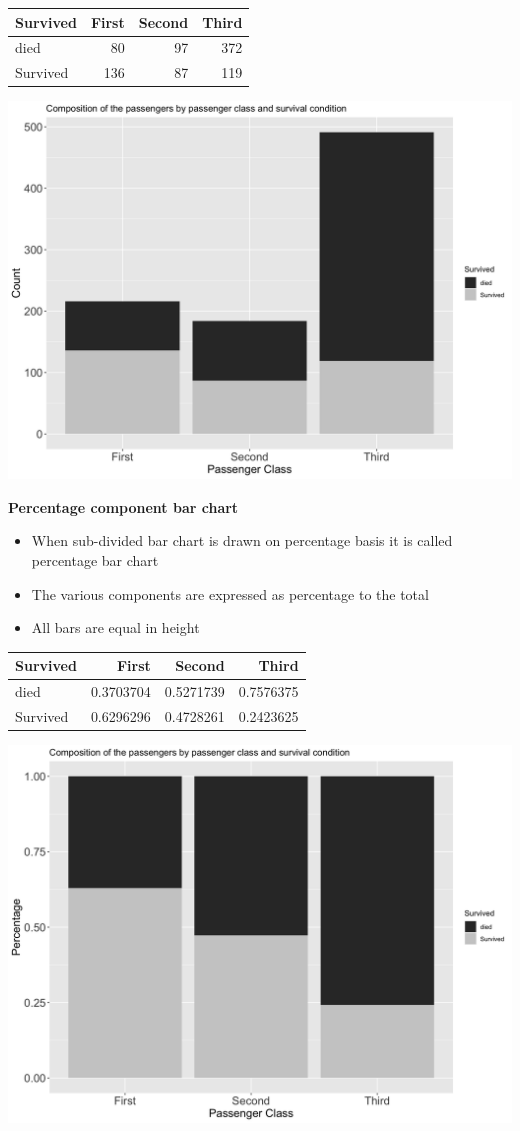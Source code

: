 \documentclass[]{book}
\providecommand{\tightlist}{%
  \setlength{\itemsep}{0pt}\setlength{\parskip}{0pt}}
\begin{document}
\begin{tabular}{l|r|r|r}
\hline
Survived & First & Second & Third\\
\hline
died & 80 & 97 & 372\\
\hline
Survived & 136 & 87 & 119\\
\hline
\end{tabular}

\begin{center}\includegraphics[width=0.8\linewidth]{figure/box10-1} \end{center}

\textbf{Percentage component bar chart}

\begin{itemize}
\tightlist
\item
  When sub-divided bar chart is drawn on percentage basis it is called percentage bar chart
\item
  The various components are expressed as percentage to the total
\item
  All bars are equal in height
\end{itemize}

\begin{tabular}{l|r|r|r}
\hline
Survived & First & Second & Third\\
\hline
died & 0.3703704 & 0.5271739 & 0.7576375\\
\hline
Survived & 0.6296296 & 0.4728261 & 0.2423625\\
\hline
\end{tabular}

\begin{center}\includegraphics[width=0.8\linewidth]{figure/box11-1} \end{center}
\end{document}

